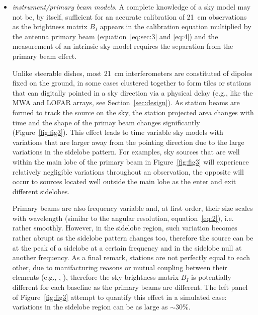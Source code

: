 \begin{itemize}
\item {\it instrument/primary beam models}. A complete knowledge of a sky model may not be, by itself, sufficient for an accurate calibration of 21~cm observations as the brightness matrix $B_I$ appears in the calibration equation multiplied by the antenna primary beam (equation~\ref{eq:sec:3} and \ref{eq:4}) and the measurement of an intrinsic sky model requires the separation from the primary beam effect. 

Unlike steerable dishes, most 21~cm interferometers are constituted of dipoles fixed on the ground, in some cases clustered together to form tiles or stations that can digitally pointed in a sky direction via a physical delay (e.g., like the MWA and LOFAR arrays, see Section~\ref{sec:design}). As station beams are formed to track the source on the sky, the station projected area changes with time and the shape of the primay beam changes significantly (Figure~\ref{fig:fig3}). This effect leads to time variable sky models with variations that are larger away from the pointing direction due to the large variations in the sidelobe pattern. For examples, sky sources that are well within the main lobe of the primary beam in Figure~\ref{fig:fig3} will experience relatively negligible variations throughout an observation, the opposite will occur to sources located well outside the main lobe as the enter and exit different sidelobes.

Primary beams are also frequency variable and, at first order, their size scales with wavelength (similar to the angular resolution, equation~\ref{eq:2}), i.e. rather smoothly. However, in the sidelobe region, such variation becomes rather abrupt as the sidelobe pattern changes too, therefore the source can be at the peak of a sidelobe at a certain frequency and in the sidelobe null at another frequency. As a final remark, stations are not perfectly equal to each other, due to manifacturing reasons or mutual coupling between their elements (e.g., \cite{ellingson28}, \cite{sutinjo15}), therefore the sky brightness matrix $B_I$ is potentially different for each baseline as the primary beams are different. The left panel of Figure~\ref{fig:fig3} attempt to quantify this effect in a simulated case: variations in the sidelobe region can be as large as $\sim 30\%$.


\end{itemize}
